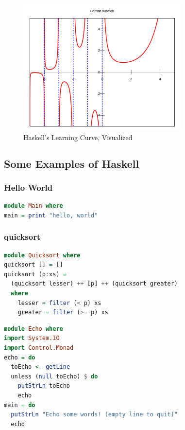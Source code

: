 \documentclass{beamer}
\begin{document}
\begin{frame}
  \begin{center}
    \begin{figure}
      \includegraphics[height=.70\paperheight]{images/gamma.png}
      \caption{Haskell's Learning Curve, Visualized}
    \end{figure}
  \end{center}
\end{frame}

\subsection{Some Examples of Haskell}

\begin{frame}[fragile]
  \frametitle{Hello World}
\begin{lstlisting}[language=haskell]
module Main where
main = print "hello, world"
\end{lstlisting}
\end{frame}

\begin{frame}[fragile]
  \frametitle{quicksort}
\begin{lstlisting}[language=haskell]
module Quicksort where
quicksort [] = []
quicksort (p:xs) =
  (quicksort lesser) ++ [p] ++ (quicksort greater)
  where
    lesser = filter (< p) xs
    greater = filter (>= p) xs
\end{lstlisting}
\end{frame}

\begin{frame}[fragile]
\begin{lstlisting}[language=haskell]
module Echo where
import System.IO
import Control.Monad
echo = do
  toEcho <- getLine
  unless (null toEcho) $ do
    putStrLn toEcho
    echo
main = do
  putStrLn "Echo some words! (empty line to quit)"
  echo
\end{lstlisting}
\end{frame}
\end{document}
